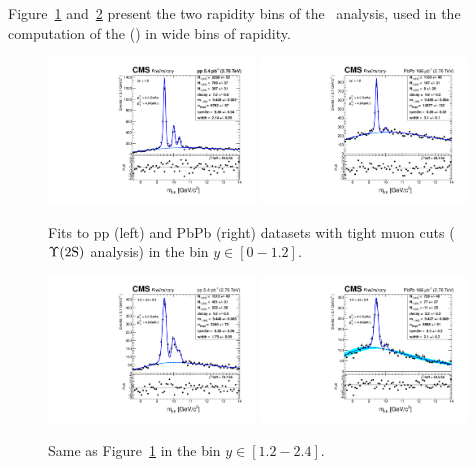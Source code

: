 Figure~\ref{fig:YieldsErfExp_y2Sa} and~\ref{fig:YieldsErfExp_y2Sb}
present the two rapidity bins of the \PgUb\ analysis, used in the
computation of the \RAA(\PgUb) in wide bins of rapidity.
\begin{figure}
   \includegraphics[width=0.49\textwidth]{Chapters/aYield/pp/pt_4_4/Rap/Rap_0_1p2/pp2p76tev_Rap_0_1p2_fsr1.pdf}
  \includegraphics[width=0.49\textwidth]{Chapters/aYield/PbPb/pt_4_4/Rap/Rap_0_1p2/PbPb_Rap_0_1p2_fsr1.pdf}
  \caption{Fits to pp (left) and PbPb (right) datasets with tight muon cuts ($\Upsilon\mathrm{(2S)}$ analysis) in the bin $y\in [0 - 1.2]$.}
  \label{fig:YieldsErfExp_y2Sa} 
\end{figure}
\begin{figure}   
    \includegraphics[width=0.49\textwidth]{Chapters/aYield/pp/pt_4_4/Rap/Rap_1p2_2p4/pp2p76tev_Rap_1p2_2p4_fsr1.pdf}
  \includegraphics[width=0.49\textwidth]{Chapters/aYield/PbPb/pt_4_4/Rap/Rap_1p2_2p4/PbPb_Rap_1p2_2p4_fsr1.pdf}
  \caption{Same as Figure~\ref{fig:YieldsErfExp_y2Sa} in the bin $y\in [1.2 - 2.4]$.}
  \label{fig:YieldsErfExp_y2Sb} 
\end{figure}
\clearpage
